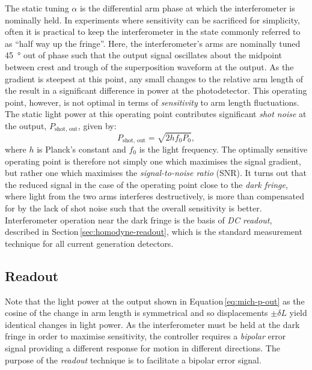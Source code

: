 The static tuning $\alpha$ is the differential arm phase at which the interferometer is nominally held. In experiments where sensitivity can be sacrificed for simplicity, often it is practical to keep the interferometer in the state commonly referred to as ``half way up the fringe''. Here, the interferometer's arms are nominally tuned \SI{45}{\degree} out of phase such that the output signal oscillates about the midpoint between crest and trough of the superposition waveform at the output. As the gradient is steepest at this point, any small changes to the relative arm length of the \MI{} result in a significant difference in power at the photodetector. This operating point, however, is not optimal in terms of \emph{sensitivity} to arm length fluctuations. The static light power at this operating point contributes significant \emph{shot noise} at the output, $P_{\text{shot, out}}$, given by:
\begin{equation}
  P_{\text{shot, out}} = \sqrt{2 h f_0 P_0},
\end{equation}
where $h$ is Planck's constant and $f_0$ is the light frequency. The optimally sensitive operating point is therefore not simply one which maximises the signal gradient, but rather one which maximises the \emph{signal-to-noise ratio} (\gls{SNR}). It turns out that the reduced signal in the case of the operating point close to the \emph{dark fringe}, where light from the two arms interferes destructively, is more than compensated for by the lack of shot noise such that the overall sensitivity is better. Interferometer operation near the dark fringe is the basis of \emph{\gls{DC} readout}, described in Section\,\ref{sec:homodyne-readout}, which is the standard measurement technique for all current generation detectors.

\subsection{\label{sec:readout}Readout}
Note that the light power at the output shown in Equation\,\ref{eq:mich-p-out} as the cosine of the change in arm length is symmetrical and so displacements $\pm \delta L$ yield identical changes in light power. As the interferometer must be held at the dark fringe in order to maximise sensitivity, the controller requires a \emph{bipolar} error signal providing a different response for motion in different directions. The purpose of the \emph{readout} technique is to facilitate a bipolar error signal.

